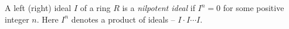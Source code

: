 \documentclass[12pt]{article}
\begin{document}
A left (right) ideal $I$ of a ring $R$ is a {\it nilpotent ideal} if $I^n = 0$ for some positive integer $n$.  Here $I^n$ denotes a product of ideals -- $I \cdot I \cdots I$.
\end{document}
